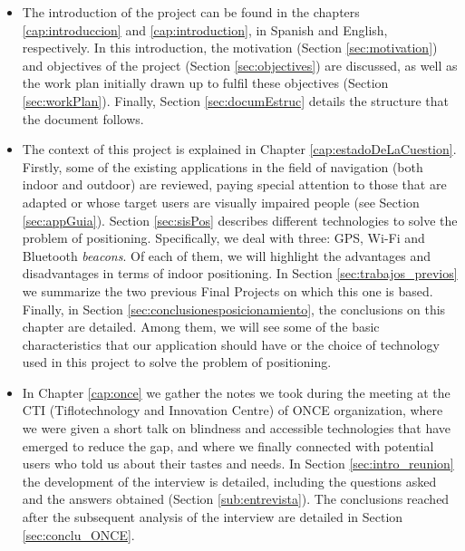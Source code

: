 \begin{itemize}
	
	\item The introduction of the project can be found in the chapters \ref{cap:introduccion} and \ref{cap:introduction}, in Spanish and English, respectively. In this introduction, the motivation (Section \ref{sec:motivation}) and objectives of the project (Section \ref{sec:objectives}) are discussed, as well as the work plan initially drawn up to fulfil these objectives (Section \ref{sec:workPlan}). Finally, Section \ref{sec:documEstruc} details the structure that the document follows.
	
	\item The context of this project is explained in Chapter \ref{cap:estadoDeLaCuestion}. Firstly, some of the existing applications in the field of navigation (both indoor and outdoor) are reviewed, paying special attention to those that are adapted or whose target users are visually impaired people (see Section \ref{sec:appGuia}). Section \ref{sec:sisPos} describes different technologies to solve the problem of positioning. Specifically, we deal with three: GPS, Wi-Fi and Bluetooth \textit{beacons}. Of each of them, we will highlight the advantages and disadvantages in terms of indoor positioning. In Section \ref{sec:trabajos_previos} we summarize the two previous Final Projects on which this one is based. Finally, in Section \ref{sec:conclusionesposicionamiento}, the conclusions on this chapter are detailed. Among them, we will see some of the basic characteristics that our application should have or the choice of technology used in this project to solve the problem of positioning. 
	
	\item In Chapter \ref{cap:once} we gather the notes we took during the meeting at the CTI (Tiflotechnology and Innovation Centre) of ONCE organization, where we were given a short talk on blindness and accessible technologies that have emerged to reduce the gap, and where we finally connected with potential users who told us about their tastes and needs. In Section \ref{sec:intro_reunion} the development of the interview is detailed, including the questions asked and the answers obtained (Section \ref{sub:entrevista}). The conclusions reached after the subsequent analysis of the interview are detailed in Section \ref{sec:conclu_ONCE}. 
	

\end{itemize}
